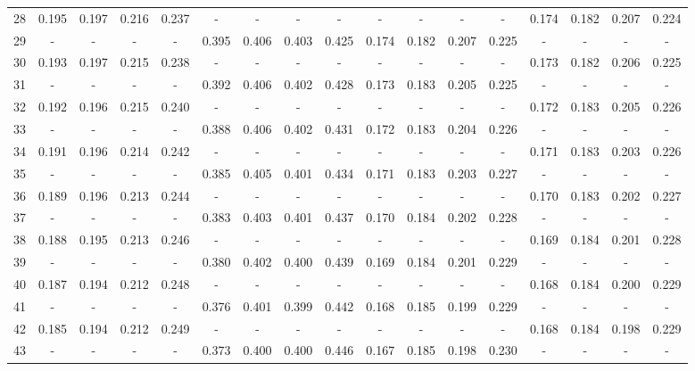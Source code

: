 \documentclass{report}
\begin{document}
\begin{table}
\begin{tabular}{|c|cccc|cccc|cccc|cccc|}
28 & 0.195 & 0.197 & 0.216 & 0.237 &   -   &   -   &   -   &   -   &   -   &   -   &   -   &   -   & 0.174 & 0.182 & 0.207 & 0.224\\
29 &   -   &   -   &   -   &   -   & 0.395 & 0.406 & 0.403 & 0.425 & 0.174 & 0.182 & 0.207 & 0.225 &   -   &   -   &   -   &   -  \\
30 & 0.193 & 0.197 & 0.215 & 0.238 &   -   &   -   &   -   &   -   &   -   &   -   &   -   &   -   & 0.173 & 0.182 & 0.206 & 0.225\\
31 &   -   &   -   &   -   &   -   & 0.392 & 0.406 & 0.402 & 0.428 & 0.173 & 0.183 & 0.205 & 0.225 &   -   &   -   &   -   &   -  \\
32 & 0.192 & 0.196 & 0.215 & 0.240 &   -   &   -   &   -   &   -   &   -   &   -   &   -   &   -   & 0.172 & 0.183 & 0.205 & 0.226\\
33 &   -   &   -   &   -   &   -   & 0.388 & 0.406 & 0.402 & 0.431 & 0.172 & 0.183 & 0.204 & 0.226 &   -   &   -   &   -   &   -  \\
34 & 0.191 & 0.196 & 0.214 & 0.242 &   -   &   -   &   -   &   -   &   -   &   -   &   -   &   -   & 0.171 & 0.183 & 0.203 & 0.226\\
35 &   -   &   -   &   -   &   -   & 0.385 & 0.405 & 0.401 & 0.434 & 0.171 & 0.183 & 0.203 & 0.227 &   -   &   -   &   -   &   -  \\
36 & 0.189 & 0.196 & 0.213 & 0.244 &   -   &   -   &   -   &   -   &   -   &   -   &   -   &   -   & 0.170 & 0.183 & 0.202 & 0.227\\
37 &   -   &   -   &   -   &   -   & 0.383 & 0.403 & 0.401 & 0.437 & 0.170 & 0.184 & 0.202 & 0.228 &   -   &   -   &   -   &   -  \\
38 & 0.188 & 0.195 & 0.213 & 0.246 &   -   &   -   &   -   &   -   &   -   &   -   &   -   &   -   & 0.169 & 0.184 & 0.201 & 0.228\\
39 &   -   &   -   &   -   &   -   & 0.380 & 0.402 & 0.400 & 0.439 & 0.169 & 0.184 & 0.201 & 0.229 &   -   &   -   &   -   &   -  \\
40 & 0.187 & 0.194 & 0.212 & 0.248 &   -   &   -   &   -   &   -   &   -   &   -   &   -   &   -   & 0.168 & 0.184 & 0.200 & 0.229\\
41 &   -   &   -   &   -   &   -   & 0.376 & 0.401 & 0.399 & 0.442 & 0.168 & 0.185 & 0.199 & 0.229 &   -   &   -   &   -   &   -  \\
42 & 0.185 & 0.194 & 0.212 & 0.249 &   -   &   -   &   -   &   -   &   -   &   -   &   -   &   -   & 0.168 & 0.184 & 0.198 & 0.229\\
43 &   -   &   -   &   -   &   -   & 0.373 & 0.400 & 0.400 & 0.446 & 0.167 & 0.185 & 0.198 & 0.230 &   -   &   -   &   -   &   -  \\

\end{tabular}
\end{table}
\end{document}
